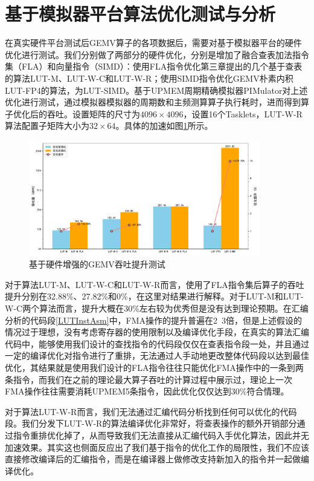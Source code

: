 \section{基于模拟器平台算法优化测试与分析}
在真实硬件平台测试后GEMV算子的各项数据后，需要对基于模拟器平台的硬件优化进行测试。我们分别做了两部分的硬件优化，分别是增加了融合查表加法指令集（FLA）和向量指令（SIMD）：使用FLA指令优化第三章提出的几个基于查表的算法LUT-M、LUT-W-C和LUT-W-R；使用SIMD指令优化GEMV朴素内积LUT-FP4的算法，为LUT-SIMD。基于UPMEM周期精确模拟器PIMulator对上述优化进行测试，通过模拟器模拟器的周期数和主频测算算子执行耗时，进而得到算子优化后的吞吐。设置矩阵的尺寸为$4096\times 4096$，设置16个Tasklets，LUT-W-R算法配置子矩阵大小为$32\times 64$。具体的加速如图\ref{EXP2-1}所示。

\begin{figure}[!htbp]
    \centering
    \includegraphics[width=0.9\textwidth]{figures/Exp2-1.pdf}
    \caption{基于硬件增强的GEMV吞吐提升测试}
	\label{EXP2-1}
\end{figure}

对于算法LUT-M、LUT-W-C和LUT-W-R而言，使用了FLA指令集后算子的吞吐提升分别在32.88\%、27.82\%和0\%，在这里对结果进行解释。对于LUT-M和LUT-W-C两个算法而言，提升大概在30\%左右较为优秀但是没有达到理论预期。在汇编分析的代码段\ref{LUTInstAsm}中，FMA操作的提升普遍在2~3倍，但是上述假设的情况过于理想，没有考虑寄存器的使用限制以及编译优化手段，在真实的算法汇编代码中，能够使用我们设计的查找指令的代码段仅仅在查表指令段一处，并且通过一定的编译优化对指令进行了重排，无法通过人手动地更改整体代码段以达到最佳优化，其结果就是使用我们设计的FLA指令往往只能优化FMA操作中的一条到两条指令，而我们在之前的理论最大算子吞吐的计算过程中展示过，理论上一次FMA操作往往需要消耗UPMEM5条指令，因此优化仅仅达到30\%符合情理。

对于算法LUT-W-R而言，我们无法通过汇编代码分析找到任何可以优化的代码段。我们分发下LUT-W-R的算法编译优化非常好，将查表操作的额外开销部分通过指令重排优化掉了，从而导致我们无法直接从汇编代码入手优化算法，因此并无加速效果。其实这也侧面反应出了我们基于指令的优化工作的局限性，我们不应该直接修改编译后的汇编指令，而是在编译器上做修改支持新加入的指令并一起做编译优化。

